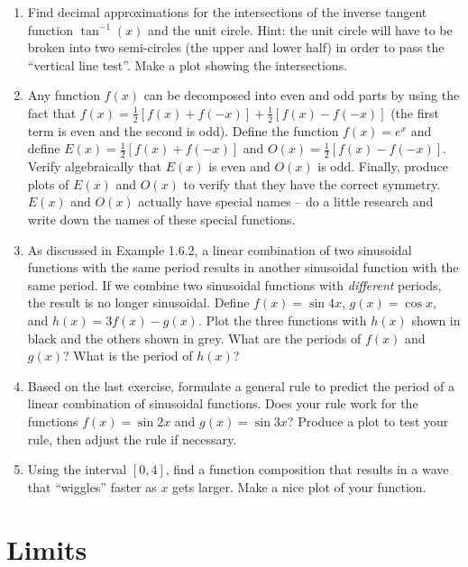 \documentclass[10.5pt,twoside]{report}
\theoremstyle{definition}
\begin{document}
\begin{enumerate}
\item
Find decimal approximations for the intersections of the inverse tangent function $\tan^{-1}(x)$ and the unit circle.  Hint:  the unit circle will have to be broken into two semi-circles (the upper and lower half) in order to pass the ``vertical line test''.  Make a plot showing the intersections.

\item
Any function $f(x)$ can be decomposed into even and odd parts by using the fact that $f(x)=\frac{1}{2}[f(x)+f(-x)]+\frac{1}{2}[f(x)-f(-x)]$ (the first term is even and the second is odd).  Define the function $f(x)=e^{x}$ and define $E(x)=\frac{1}{2}[f(x)+f(-x)]$ and $O(x)=\frac{1}{2}[f(x)-f(-x)]$.  Verify algebraically that $E(x)$ is even and $O(x)$ is odd.  Finally, produce plots of $E(x)$ and $O(x)$ to verify that they have the correct symmetry.  $E(x)$ and $O(x)$ actually have special names -- do a little research and write down the names of these special functions. 
 
\item
As discussed in Example 1.6.2, a linear combination of two sinusoidal functions with the same period results in another sinusoidal function with the same period.  If we combine two sinusoidal functions with \textit{different} periods, the result is no longer sinusoidal.  Define $f(x)=\sin{4x}$,  $g(x)=\cos{x}$, and $h(x)=3f(x)-g(x)$.  Plot the three functions with $h(x)$ shown in black and the others shown in grey.  What are the periods of $f(x)$ and $g(x)$?  What is the period of $h(x)$?  

\item
Based on the last exercise, formulate a general rule to predict the period of a linear combination of sinusoidal functions.  Does your rule work for the functions $f(x)=\sin{2x}$ and $g(x)=\sin{3x}$?  Produce a plot to test your rule, then adjust the rule if necessary.

\item
Using the interval $[0,4]$, find a function composition that results in a wave that ``wiggles'' faster as $x$ gets larger.  Make a nice plot of your function.


\end{enumerate}



\pagebreak

\chapter{Limits}
\end{document}

